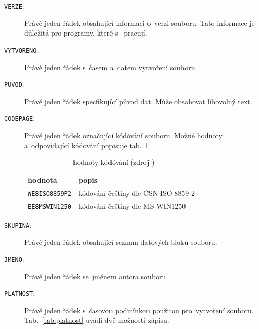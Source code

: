\begin{description}
	\item[\texttt{VERZE}:] Právě jeden řádek obsahující informaci o~verzi  souboru. Tato informace je důležitá pro programy, které s~ pracují.
	\item[\texttt{VYTVORENO}:] Právě jeden řádek s~časem a~datem vytvoření souboru.
	\item[\texttt{PUVOD}:] Právě jeden řádek specfikující původ dat. Může obsahovat libovolný text.
	\item[\texttt{CODEPAGE}:] Právě jeden řádek označující kódóvání souboru. Možné hodnoty a~odpovídající kódování popisuje tab.~\ref{tab:kodovani}.

    \begin{table}[H]
        \begin{tabular}{|l|l|}
            \hline
             hodnota & popis \\
            \hline
            \hline
             \texttt{WE8ISO8859P2} & kódování češtiny dle ČSN ISO 8859-2 \\ \hline
             \texttt{EE8MSWIN1250} & kódování češtiny dle MS WIN1250 \\
             \hline
        \end{tabular}
        \centering
        \caption[ - hodnoty kódóvání]{ - hodnoty kódóvání (zdroj \citep{struktura_vfk})}
        \label{tab:kodovani}
    \end{table}

	\item[\texttt{SKUPINA}:] Právě jeden řádek obsahující seznam datových bloků souboru.
	\item[\texttt{JMENO}:] Právě jeden řádek se~jménem autora souboru.
	\item[\texttt{PLATNOST}:] Právě jeden řádek s~časovou podmínkou použitou pro~vytvoření souboru. Tab.~\ref{tab:platnost} uvádí dvě možnosti zápisu.


\end{description}
